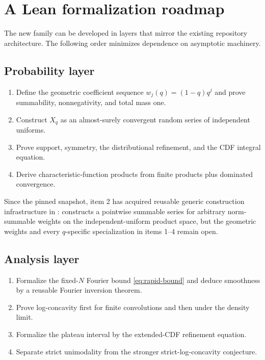 \documentclass[11pt,oneside]{article}
\theoremstyle{definition}
\theoremstyle{remark}
\begin{document}
\section{A Lean formalization roadmap}
\label{sec:lean}

The new family can be developed in layers that mirror the existing repository architecture.
The following order minimizes dependence on asymptotic machinery.

\subsection{Probability layer}

\begin{enumerate}
\item Define the geometric coefficient sequence $w_j(q)= (1-q)q^j$ and prove summability,
      nonnegativity, and total mass one.
\item Construct $X_q$ as an almost-surely convergent random series of independent uniforms.
\item Prove support, symmetry, the distributional refinement, and the CDF integral equation.
\item Derive characteristic-function products from finite products plus dominated convergence.
\end{enumerate}

Since the pinned snapshot, item 2 has acquired reusable generic construction infrastructure
in :  constructs a pointwise
summable series for arbitrary norm-summable weights on the independent-uniform product
space, but the geometric weights and every $q$-specific specialization in items 1--4 remain
open.

\subsection{Analysis layer}

\begin{enumerate}
\item Formalize the fixed-$N$ Fourier bound \eqref{eq:rapid-bound} and deduce smoothness by a
      reusable Fourier inversion theorem.
\item Prove log-concavity first for finite convolutions and then under the density limit.
\item Formalize the plateau interval by the extended-CDF refinement equation.
\item Separate strict unimodality from the stronger strict-log-concavity conjecture.
\end{enumerate}
\end{document}
